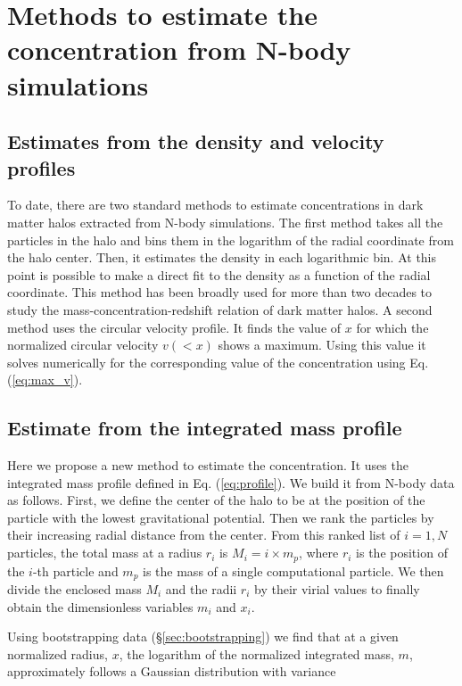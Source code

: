 \documentclass{emulateapj}
\begin{document}
\section{Methods to estimate the concentration from N-body simulations}
\label{sec:method}

\subsection{Estimates from the density and velocity profiles}

To date, there are two standard methods to estimate concentrations in
dark matter halos extracted from N-body simulations.  The first method
takes all the particles in the halo and bins them in the logarithm of
the radial coordinate from the halo center.  Then, it estimates the
density in each logarithmic bin.  At this point is possible to make a
direct fit to the density as a function of the radial coordinate.
This method has been broadly used for more than two decades to study
the mass-concentration-redshift relation of dark matter halos. 
A second method uses the circular velocity profile.  It finds the
value of $x$ for which the normalized circular velocity $v(<x)$ shows
a maximum.  Using this value it solves numerically for the
corresponding value of the concentration using Eq. (\ref{eq:max_v}). 


\subsection{Estimate from the integrated mass profile}

Here we propose a new method to estimate the concentration. 
It uses the integrated mass profile defined in
Eq. (\ref{eq:profile}).  We build it from N-body data as follows.
First, we define the center of the halo to be at the position of the
particle with the lowest gravitational potential. Then we rank the
particles by their increasing radial distance from the center.  From
this ranked list of $i=1,N$ particles, the total mass at a radius
$r_i$ is $M_i=i\times m_p$, where $r_i$ is the position of the $i$-th
particle and $m_p$ is the mass of a single computational particle. 
We then divide the enclosed mass $M_i$ and the radii $r_i$ by their
virial values to finally obtain the dimensionless variables $m_i$ and
$x_i$. 


Using bootstrapping data (\S \ref{sec:bootstrapping}) we find that at
a given normalized radius, $x$, the logarithm of the normalized
integrated mass, $m$, approximately follows a Gaussian distribution
with variance
\end{document}
